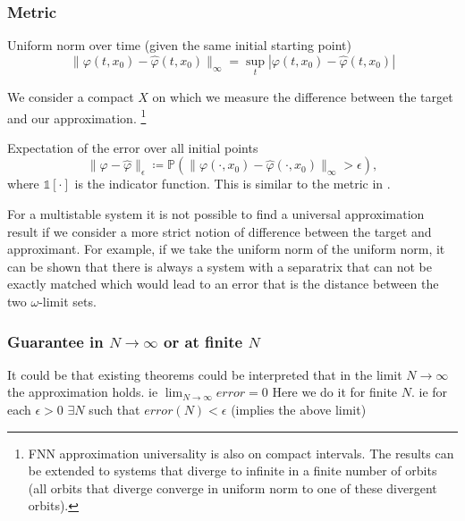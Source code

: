 \documentclass{article}
\theoremstyle{definition}
\theoremstyle{remark}
\newcommand{\vol}{\operatorname{vol}}
\begin{document}
\subsubsection{Metric}
Uniform norm over time (given the same initial starting point)
\begin{equation}
\|\varphi(t,x_0)-\hat \varphi(t,x_0)\|_\infty = \sup_t|\varphi(t,x_0)-\hat \varphi(t,x_0)|
\end{equation}

We consider a compact $X$ on which we measure the difference between the target and our approximation.
\footnote{FNN approximation universality is also on compact intervals.
The results can be extended to systems that diverge to infinite in a finite number of orbits (all orbits that diverge converge in uniform norm to one of these divergent orbits).}

Expectation of the error over all initial points
\begin{equation}
\|\varphi-\hat \varphi\|_\epsilon \coloneqq  \mathbb{P}\left(\|\varphi(\cdot,x_0)-\hat \varphi(\cdot,x_0)\|_\infty>\epsilon\right),
\end{equation}
where $\mathds{1}[\cdot]$ is the indicator function. 
This is similar to the metric in \citep{hammer2000approximation}.


For a multistable system it is not possible to find a universal approximation result if we consider a more strict notion of difference between the target and approximant.
For example, if we take the uniform norm of the uniform norm, it can be shown that there is always a system with a separatrix that can not be exactly matched which would lead to an error that is the distance between the two $\omega$-limit sets.

\subsubsection{Guarantee in $N\rightarrow\infty$ or at finite $N$}
It could be that existing theorems could be interpreted that in the limit $N\rightarrow\infty$ the approximation holds. %
ie $\lim_{N\rightarrow\infty} error = 0$
Here we do it for finite $N$.
ie for each $\epsilon>0$ $\exists N$ such that $error(N) < \epsilon$
(implies the above limit)
\end{document}
